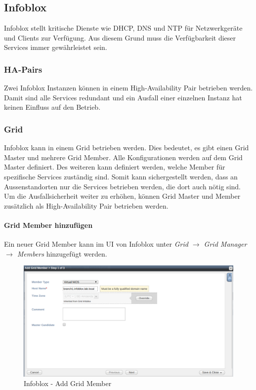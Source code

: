 \subsection{Infoblox}

Infoblox stellt kritische Dienste wie DHCP, DNS und NTP für Netzwerkgeräte und Clients zur Verfügung. Aus diesem Grund muss die Verfügbarkeit dieser Services immer gewährleistet sein.

\subsubsection{HA-Pairs}
Zwei Infoblox Instanzen können in einem High-Availability Pair betrieben werden. Damit sind alle Services redundant und ein Ausfall einer einzelnen Instanz hat keinen Einfluss auf den Betrieb. 

\subsubsection{Grid}
Infoblox kann in einem Grid betrieben werden. Dies bedeutet, es gibt einen Grid Master und mehrere Grid Member. Alle Konfigurationen werden auf dem Grid Master definiert. Des weiteren kann definiert werden, welche Member für spezifische Services zuständig sind. Somit kann sichergestellt werden, dass an Aussenstandorten nur die Services betrieben werden, die dort auch nötig sind. Um die Ausfallsicherheit weiter zu erhöhen, können Grid Master und Member zusätzlich als High-Availability Pair betrieben werden.

\paragraph{Grid Member hinzufügen}

Ein neuer Grid Member kann im UI von Infoblox unter \textit{Grid $\rightarrow$ Grid Manager $\rightarrow$ Members} hinzugefügt werden.

\begin{figure}[H]
	\centering
	\includegraphics[width=1\linewidth]{img/Absicherung/Infoblox_Add_Grid_Member.png}
	\caption{Infoblox - Add Grid Member}
	\label{fig:Infoblox - Add Grid Member}
\end{figure}

